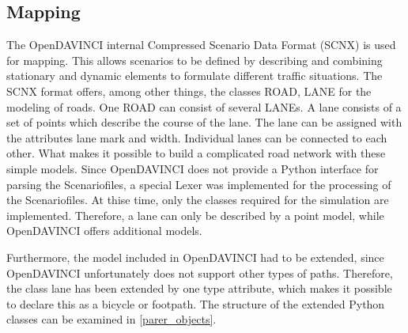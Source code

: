 \documentclass[11pt,oneside,openright]{mpreport}
\begin{document}
\subsection{Mapping}
The OpenDAVINCI internal Compressed Scenario Data Format (SCNX) \cite{Berger2010} is used for mapping. This allows scenarios to be defined by describing and combining stationary and dynamic elements
to formulate different traffic situations. The SCNX format offers, among other things, the classes ROAD, LANE for the modeling of roads. One ROAD can consist of several LANEs.
A lane consists of a set of points which describe the course of the lane. The lane can be assigned with the attributes lane mark and width. 
Individual lanes can be connected to each other. What makes it possible to build a complicated road network with these simple models. 
Since OpenDAVINCI does not provide a Python interface for parsing the Scenariofiles, a special Lexer was implemented for the processing of the Scenariofiles. 
At thise time, only the classes required for the simulation are implemented. Therefore, a lane can only be described by a point model, while OpenDAVINCI offers additional models.

Furthermore, the model included in OpenDAVINCI had to be extended, since OpenDAVINCI unfortunately does not support other types of paths.
Therefore, the class lane has been extended by one type attribute, which makes it possible to declare this as a bicycle or footpath.
The structure of the extended Python classes can be examined in \cref{parer_objects}.
\end{document}
